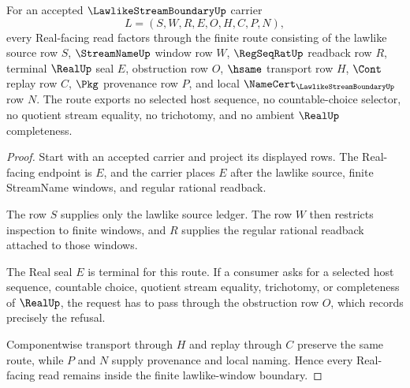 \begin{theorem}
\label{thm:lawlike-stream-boundary-real-nonescape}
For an accepted $\LawlikeStreamBoundaryUp$ carrier
$$
L=(S,W,R,E,O,H,C,P,N),
$$
every Real-facing read factors through the finite route consisting of the lawlike source row $S$, $\StreamNameUp$ window row $W$, $\RegSeqRatUp$ readback row $R$, terminal $\RealUp$ seal $E$, obstruction row $O$, $\hsame$ transport row $H$, $\Cont$ replay row $C$, $\Pkg$ provenance row $P$, and local $\NameCert_{\LawlikeStreamBoundaryUp}$ row $N$. The route exports no selected host sequence, no countable-choice selector, no quotient stream equality, no trichotomy, and no ambient $\RealUp$ completeness.
\end{theorem}
\begin{proof}
Start with an accepted carrier and project its displayed rows. The Real-facing endpoint is $E$, and the carrier places $E$ after the lawlike source, finite StreamName windows, and regular rational readback.

The row $S$ supplies only the lawlike source ledger. The row $W$ then restricts inspection to finite windows, and $R$ supplies the regular rational readback attached to those windows.

The Real seal $E$ is terminal for this route. If a consumer asks for a selected host sequence, countable choice, quotient stream equality, trichotomy, or completeness of $\RealUp$, the request has to pass through the obstruction row $O$, which records precisely the refusal.

Componentwise transport through $H$ and replay through $C$ preserve the same route, while $P$ and $N$ supply provenance and local naming. Hence every Real-facing read remains inside the finite lawlike-window boundary.
\end{proof}


\begin{closurestatus}{\LawlikeStreamBoundaryUp}
  \theoryclosure{\seedClosure}
  \formalstatus{\unformalizedV}
\end{closurestatus}
